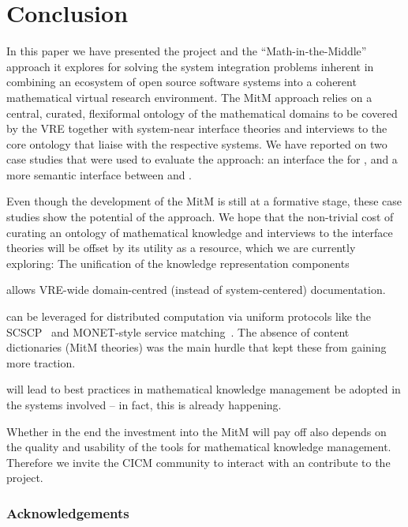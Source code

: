 \section{Conclusion}\label{sec:concl}
In this paper we have presented the \ODK project and the ``Math-in-the-Middle'' approach
it explores for solving the system integration problems inherent in combining an ecosystem
of open source software systems into a coherent mathematical virtual research environment.
The MitM approach relies on a central, curated, flexiformal ontology of the mathematical
domains to be covered by the VRE together with system-near interface theories and
interviews to the core ontology that liaise with the respective systems. We have reported
on two case studies that were used to evaluate the approach: an interface the for \LMFDB,
and a more semantic interface between \GAP and \Sage. 

Even though the development of the MitM is still at a formative stage, these case studies
show the potential of the approach. We hope that the non-trivial cost of curating an
ontology of mathematical knowledge and interviews to the interface theories will be offset
by its utility as a resource, which we are currently exploring: The unification of the
knowledge representation components
\begin{compactitem}
\item allows VRE-wide domain-centred (instead of system-centered) documentation.
\item can be leveraged for distributed computation via uniform protocols like the
  SCSCP~\cite{HorRoz:ossp09} and MONET-style service
  matching~\cite{CaprottiEtAl:MathServiceMatching04:tr}. The absence of content
  dictionaries (MitM theories) was the main hurdle that kept these from gaining more
  traction.
\item will lead to best practices in mathematical knowledge management be adopted in the
  systems involved -- in fact, this is already happening.
\end{compactitem}
Whether in the end the investment into the MitM will pay off also depends on the quality
and usability of the tools for mathematical knowledge management. Therefore we invite the
CICM community to interact with an contribute to the \ODK project. 

\subsubsection*{Acknowledgements}

